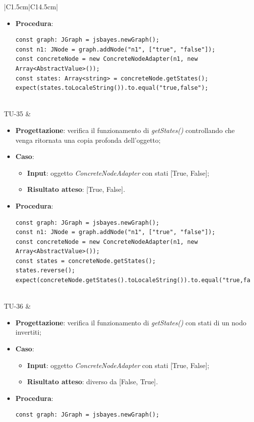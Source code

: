 \begin{longtable}{|C{1.5cm}|C{14.5cm}|}
\begin{itemize}
		\item \textbf{Procedura}:
		\begin{lstlisting}
const graph: JGraph = jsbayes.newGraph();
const n1: JNode = graph.addNode("n1", ["true", "false"]);
const concreteNode = new ConcreteNodeAdapter(n1, new Array<AbstractValue>());
const states: Array<string> = concreteNode.getStates();
expect(states.toLocaleString()).to.equal("true,false");
		\end{lstlisting}
	\end{itemize}\\
	\hline
	{TU-35} &
	\begin{itemize}
		\item \textbf{Progettazione}: verifica il funzionamento di \emph{getStates()} controllando che venga ritornata una copia profonda dell'oggetto;
		\item \textbf{Caso}: 
		\begin{itemize}
			\item \textbf{Input}: oggetto \emph{ConcreteNodeAdapter} con stati [True, False];
			\item \textbf{Risultato atteso}: [True, False].
		\end{itemize}
		\item \textbf{Procedura}:
		\begin{lstlisting}
const graph: JGraph = jsbayes.newGraph();
const n1: JNode = graph.addNode("n1", ["true", "false"]);
const concreteNode = new ConcreteNodeAdapter(n1, new Array<AbstractValue>());
const states = concreteNode.getStates();
states.reverse();
expect(concreteNode.getStates().toLocaleString()).to.equal("true,false");
		\end{lstlisting}
	\end{itemize}\\
	\hline
	{TU-36} &
	\begin{itemize}
		\item \textbf{Progettazione}: verifica il funzionamento di \emph{getStates()} con stati di un nodo invertiti;
		\item \textbf{Caso}: 
		\begin{itemize}
			\item \textbf{Input}: oggetto \emph{ConcreteNodeAdapter} con stati [True, False];
			\item \textbf{Risultato atteso}: diverso da [False, True].
		\end{itemize}
		\item \textbf{Procedura}:
		\begin{lstlisting}
const graph: JGraph = jsbayes.newGraph();

\end{lstlisting}
\end{itemize}
\end{longtable}

